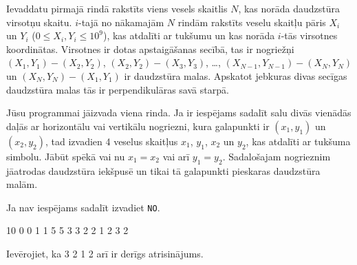 \documentclass{boi2014-lv}
\newcommand{\constant}[1]{{\tt #1}}
\begin{document}
    \Input
		
		Ievaddatu pirmajā rindā rakstīts viens vesels skaitlis $N$, kas norāda daudzstūra virsotņu skaitu. $i$-tajā no nākamajām $N$ rindām rakstīts veselu skaitļu pāris $X_i$ un $Y_i$ ($0 \le X_i, Y_i \le 10^9$), kas atdalīti ar tukšumu un kas norāda $i$-tās virsotnes koordinātas. Virsotnes ir dotas apstaigāšanas secībā, tas ir nogriežņi $(X_1,Y_1) - (X_2,Y_2)$,
    $(X_2,Y_2) - (X_3,Y_3)$, \ldots, $(X_{N-1},Y_{N-1}) - (X_N,Y_N)$ un
    $(X_N,Y_N) - (X_1,Y_1)$ ir daudzstūra malas. Apskatot jebkuras divas secīgas daudzstūra malas tās ir perpendikulāras savā starpā.


	\Output
	
		Jūsu programmai jāizvada viena rinda. Ja ir iespējams sadalīt salu divās vienādās daļās ar horizontālu vai vertikālu nogriezni, kura galapunkti ir $(x_1, y_1)$ un $(x_2, y_2)$, tad izvadien 4 veselus skaitļus $x_1$, $y_1$, $x_2$ un $y_2$, kas atdalīti ar tukšuma simbolu. Jābūt spēkā vai nu $x_1 = x_2$ vai arī $y_1 = y_2$. Sadalošajam nogrieznim jāatrodas daudzstūra iekšpusē un tikai tā galapunkti pieskaras daudzstūra malām.

	Ja nav iespējams sadalīt izvadiet	\constant{NO}.

    \Examples
	\example
	{
		10  0  0  1  1  5  5  3  3  2  2
	}
	{
		1 2 3 2
	}
	{
		Ievērojiet, ka 3 2 1 2 arī ir derīgs atrisinājums.

        \begin{center}
        \end{center}

	}
\end{document}
